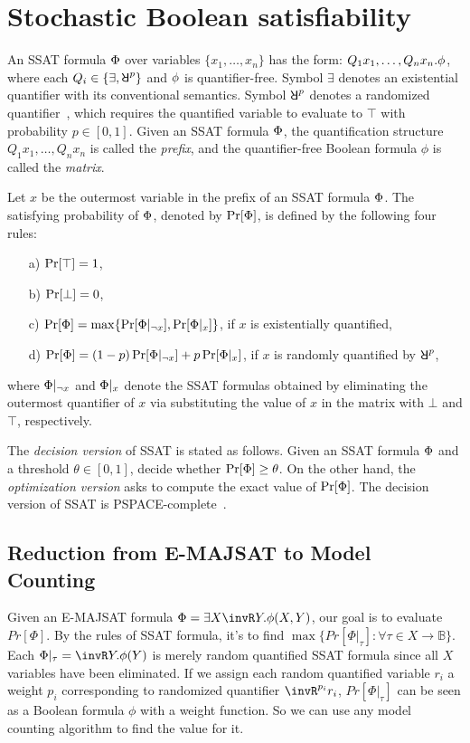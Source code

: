 \section{Stochastic Boolean satisfiability}
\label{sect:ssat}

An SSAT formula $\Phi$ over variables $\{x_1,\ldots,x_n\}$ has the form:
$Q_1x_1,\ldots,Q_nx_n.\phi$,
where each $Q_i\in\{\exists,\random{p}\}$ and $\phi$ is quantifier-free.
Symbol $\exists$ denotes an existential quantifier with its conventional semantics.
Symbol $\random{p}$ denotes a randomized quantifier~\cite{Papadimitriou1985}, which requires
the quantified variable to evaluate to $\top$ with probability $p\in[0,1]$.
Given an SSAT formula $\Phi$, the quantification structure $Q_1 x_1, \ldots, Q_n x_n$ is called the \emph{prefix},
and the quantifier-free Boolean formula $\phi$ is called the \emph{matrix}.

Let $x$ be the outermost variable in the prefix of an SSAT formula $\Phi$.
The satisfying probability of $\Phi$, denoted by $\Pr[\Phi]$, is defined by the following four rules:
\begin{enumerate}
    \item[a)] $\Pr[\top]=1$,
    \item[b)] $\Pr[\bot]=0$,
    \item[c)] $\Pr[\Phi]=\max\{\Pr[\Phi|_{\lnot x}],\Pr[\Phi|_{x}]\}$, if $x$ is existentially quantified,
    \item[d)] $\Pr[\Phi]=(1-p)\Pr[\Phi|_{\lnot x}]+p\Pr[\Phi|_{x}]$, if $x$ is randomly quantified by $\random{p}$,
\end{enumerate}
where $\Phi|_{\lnot x}$ and $\Phi|_{x}$ denote the SSAT formulas obtained by eliminating the outermost quantifier of $x$ via substituting the value of $x$ in the matrix with $\bot$ and $\top$, respectively.

The \textit{decision version} of SSAT is stated as follows.
Given an SSAT formula $\Phi$ and a threshold $\theta\in[0,1]$, decide whether $\Pr[\Phi]\geq\theta$.
On the other hand, the \textit{optimization version} asks to compute the exact value of $\Pr[\Phi]$.
The decision version of SSAT is PSPACE-complete~\cite{Papadimitriou1985}.

\iffalse
    \subsection{Reduction from E-MAJSAT to Model Counting}
    Given an E-MAJSAT formula $\Phi=\exists X \invR Y. \phi(X,Y)$, our goal is to evaluate $Pr[\Phi]$. By the rules of SSAT formula, it's to find $\max\{Pr[\Phi|_{\tau}]:\forall \tau \in X \rightarrow \mathbb{B}\}$. Each $\Phi|_{\tau} = \invR Y.\phi (Y)$ is merely random quantified SSAT formula since all $X$ variables have been eliminated. If we assign each random quantified variable $r_i$ a weight $p_i$ corresponding to randomized quantifier $\invR^{p_i} r_i$, $Pr[\Phi|_{\tau}]$ can be seen as a Boolean formula $\phi$ with a weight function. So we can use any model counting algorithm to find the value for it.

